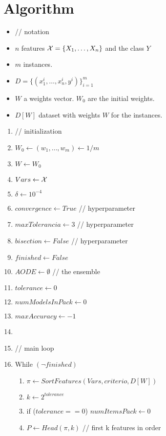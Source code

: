 \section{Algorithm}
\begin{itemize}
\item[] // notation
\item $n$ features ${\cal{X}} = \{X_1, \dots, X_n\}$ and the class $Y$
\item $m$ instances. 
\item $D = \{ (x_1^i, \dots, x_n^i, y^i) \}_{i=1}^{m}$
\item $W$ a weights vector. $W_0$ are the initial weights.
\item $D[W]$ dataset with weights $W$ for the instances.
\end{itemize}
\bigskip


\begin{enumerate}
\item[] // initialization
\item $W_0 \leftarrow (w_1, \dots, w_m) \leftarrow 1/m$
\item $W \leftarrow W_0$
\item $Vars \leftarrow {\cal{X}}$
\item $\delta \leftarrow 10^{-4}$
\item $convergence \leftarrow True$ // hyperparameter
\item $maxTolerancia \leftarrow 3$ // hyperparameter
\item $bisection \leftarrow False$ // hyperparameter
\item $finished \leftarrow False$
\item $AODE \leftarrow \emptyset$ \hspace*{2cm} // the ensemble
\item $tolerance \leftarrow 0$
\item $numModelsInPack \leftarrow 0$
\item $maxAccuracy \leftarrow -1$
\item[] 
\newpage
\item[] // main loop
\item While $(\lnot finished)$
\begin{enumerate}
    \item $\pi \leftarrow SortFeatures(Vars, criterio, D[W])$
    \item $k \leftarrow 2^{tolerance}$
    \item if ($tolerance == 0$) $numItemsPack \leftarrow0$
    \item $P \leftarrow Head(\pi,k)$ \hspace*{2cm} //  first k features in order

\end{enumerate}
\end{enumerate}
